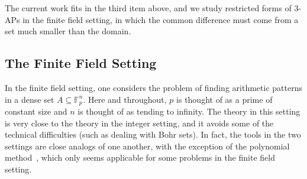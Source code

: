 \documentclass[11pt]{article}
\begin{document}
The current work fits in the third item above, and we study restricted forms of $3$-APs in the finite field setting, in which the common difference must come from a set much smaller than the domain.

\subsection{The Finite Field Setting}
In the finite field setting, one considers the problem of finding arithmetic patterns in a dense set $A\subseteq \mathbb{F}_p^n$. Here and throughout, $p$ is thought of as a prime of constant size and $n$ is thought of as tending to infinity.  The theory in this setting is very close  to the theory in the integer setting, and it avoids some of the technical difficulties (such as dealing with Bohr sets). In fact, the tools in the two settings are close analogs of one another, with the exception of the polynomial method~\cite{CrootLevPach2017,EllenbergGijswijt2017}, which only seems applicable for some problems in the finite field setting. 
\end{document}
